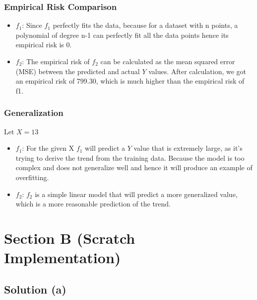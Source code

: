 \documentclass{article}
\begin{document}
\subsubsection*{Empirical Risk Comparison}
\begin{itemize}
\item $f_1$: Since $f_1$ perfectly fits the data, because for a dataset with n points, a polynomial of degree n-1 can perfectly fit all the data points hence its empirical risk is 0.
\item $f_2$: The empirical risk of $f_2$ can be calculated as the mean squared error (MSE) between the predicted and actual $Y$ values. After calculation, we got an empirical risk of 799.30, which is much higher than the empirical risk of f1.
\end{itemize}


\subsubsection*{Generalization}

Let $X = 13$

\begin{itemize}
\item $f_1$: For the given X $f_1$ will predict a $Y$ value that is extremely large, as it's trying to derive the trend from the training data. Because the model is too complex and does not generalize well and hence it will produce an example of overfitting.
\item $f_2$: $f_2$ is a simple linear model that will predict a more generalized value, which is a more reasonable prediction of the trend.
\end{itemize}


\vspace{50pt} %
\section{Section B (Scratch Implementation)}
\subsection*{Solution (a)}
\end{document}
